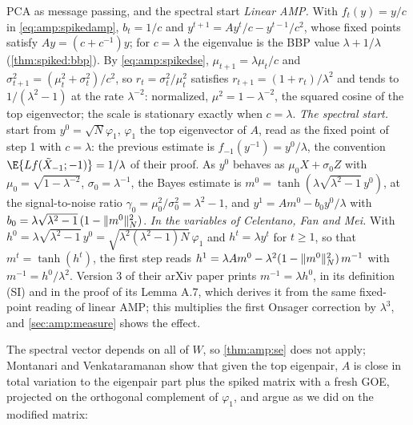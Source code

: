 \begin{refsection}
\begin{computation}{PCA as message passing, and the spectral start}\label{comp:amp:pca}
\step \emph{Linear AMP.} With $f_t(y)=y/c$ in \eqref{eq:amp:spikedamp}, $b_t=1/c$ and $y^{t+1}=Ay^t/c-y^{t-1}/c^2$, whose fixed points satisfy $Ay=(c+c^{-1})y$; for $c=\lambda$ the eigenvalue is the BBP value $\lambda+1/\lambda$ (\cref{thm:spiked:bbp}). By \eqref{eq:amp:spikedse}, $\mu_{t+1}=\lambda\mu_t/c$ and $\sigma_{t+1}^2=(\mu_t^2+\sigma_t^2)/c^2$, so $r_t=\sigma_t^2/\mu_t^2$ satisfies $r_{t+1}=(1+r_t)/\lambda^2$ and tends to $1/(\lambda^2-1)$ at the rate $\lambda^{-2}$: normalized, $\mu^2=1-\lambda^{-2}$, the squared cosine of the top eigenvector; the scale is stationary exactly when $c=\lambda$.
\step \emph{The spectral start.} \Textcite{MontanariVenkataramanan2021} start from $y^0=\sqrt N\varphi_1$, $\varphi_1$ the top eigenvector of $A$, read as the fixed point of step 1 with $c=\lambda$: the previous estimate is $f_{-1}(y^{-1})=y^0/\lambda$, the convention $\E\{Lf(\tilde X_{-1};-1)\}=1/\lambda$ of their proof. As $y^0$ behaves as $\mu_0X+\sigma_0Z$ with $\mu_0=\sqrt{1-\lambda^{-2}}$, $\sigma_0=\lambda^{-1}$, the Bayes estimate is $m^0=\tanh(\lambda\sqrt{\lambda^2-1}\,y^0)$, at the signal-to-noise ratio $\gamma_0=\mu_0^2/\sigma_0^2=\lambda^2-1$, and $y^1=Am^0-b_0y^0/\lambda$ with $b_0=\lambda\sqrt{\lambda^2-1}\,(1-\lVert m^0\rVert_N^2)$.
\step \emph{In the variables of Celentano, Fan and Mei.} With $h^0=\lambda\sqrt{\lambda^2-1}\,y^0=\sqrt{\lambda^2(\lambda^2-1)N}\,\varphi_1$ and $h^t=\lambda y^t$ for $t\ge1$, so that $m^t=\tanh(h^t)$, the first step reads $h^1=\lambda Am^0-\lambda^2(1-\lVert m^0\rVert_N^2)\,m^{-1}$ with $m^{-1}=h^0/\lambda^2$. Version 3 of their arXiv paper prints $m^{-1}=\lambda h^0$, in its definition (SI) and in the proof of its Lemma A.7, which derives it from the same fixed-point reading of linear AMP; this multiplies the first Onsager correction by $\lambda^3$, and \cref{sec:amp:measure} shows the effect.
\end{computation}

The spectral vector depends on all of $W$, so \cref{thm:amp:se} does not apply; Montanari and Venkataramanan show that given the top eigenpair, $A$ is close in total variation to the eigenpair part plus the spiked matrix with a fresh GOE, projected on the orthogonal complement of $\varphi_1$, and argue as we did on the modified matrix:


\end{refsection}
